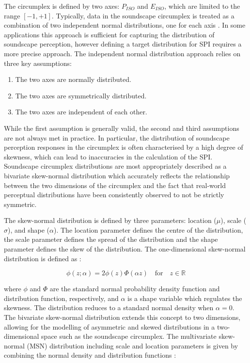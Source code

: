 \documentclass[
  authoryear,
  3p]{elsarticle}
\providecommand{\tightlist}{%
  \setlength{\itemsep}{0pt}\setlength{\parskip}{0pt}}\usepackage{longtable,booktabs,array}
\begin{document}
The circumplex is defined by two axes: \(P_{ISO}\) and \(E_{ISO}\),
which are limited to the range \([-1, +1]\). Typically, data in the
soundscape circumplex is treated as a combination of two independent
normal distributions, one for each axis
\citep{Mitchell2022How, Ooi2022Probably}. In some applications this
approach is sufficient for capturing the distribution of soundscape
perception, however defining a target distribution for SPI requires a
more precise approach. The independent normal distribution approach
relies on three key assumptions:

\begin{enumerate}
\def\labelenumi{\arabic{enumi}.}
\tightlist
\item
  The two axes are normally distributed.
\item
  The two axes are symmetrically distributed.
\item
  The two axes are independent of each other.
\end{enumerate}

While the first assumption is generally valid, the second and third
assumptions are not always met in practice. In particular, the
distribution of soundscape perception responses in the circumplex is
often characterised by a high degree of skewness, which can lead to
inaccuracies in the calculation of the SPI. Soundscape circumplex
distributions are most appropriately described as a bivariate
skew-normal distribution \citep{Azzalini2005Skew} which accurately
reflects the relationship between the two dimensions of the circumplex
and the fact that real-world perceptual distributions have been
consistently observed to not be strictly symmetric.

The skew-normal distribution is defined by three parameters: location
(\(\mu\)), scale (\(\sigma\)), and shape (\(\alpha\)). The location
parameter defines the centre of the distribution, the scale parameter
defines the spread of the distribution and the shape parameter defines
the skew of the distribution. The one-dimensional skew-normal
distribution is defined as \citep{Azzalini1996Multivariate}:

\[
\phi(z; \alpha) = 2 \phi(z) \Phi(\alpha z) \quad \text{for} \quad z \in \mathbb{R}
\]

where \(\phi\) and \(\Phi\) are the standard normal probability density
function and distribution function, respectively, and \(\alpha\) is a
shape variable which regulates the skewness. The distribution reduces to
a standard normal density when \(\alpha = 0\). The bivariate skew-normal
distribution extends this concept to two dimensions, allowing for the
modelling of asymmetric and skewed distributions in a two-dimensional
space such as the soundscape circumplex. The multivariate skew-normal
(MSN) distribution including scale and location parameters is given by
combining the normal density and distribution functions
\citep{Azzalini1999Statistical}:
\end{document}
